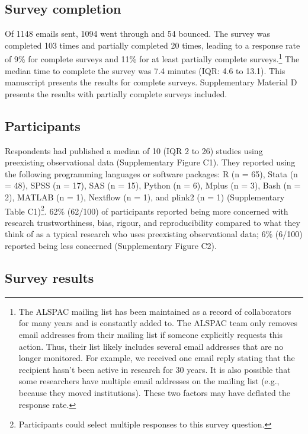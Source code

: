 \documentclass[
  man,floatsintext]{apa6}
\begin{document}
\hypertarget{survey-completion}{%
\subsection{Survey completion}\label{survey-completion}}

Of 1148 emails sent, 1094 went through and 54 bounced. The survey was completed 103 times and partially completed 20 times, leading to a response rate of 9\% for complete surveys and 11\% for at least partially complete surveys.\footnote[1]{The ALSPAC mailing list has been maintained as a record of collaborators for many years and is constantly added to. The ALSPAC team only removes email addresses from their mailing list if someone explicitly requests this action. Thus, their list likely includes several email addresses that are no longer monitored. For example, we received one email reply stating that the recipient hasn’t been active in research for 30 years. It is also possible that some researchers have multiple email addresses on the mailing list (e.g., because they moved institutions). These two factors may have deflated the response rate.} The median time to complete the survey was 7.4 minutes (IQR: 4.6 to 13.1). This manuscript presents the results for complete surveys. Supplementary Material D presents the results with partially complete surveys included.

\hypertarget{participants-1}{%
\subsection{Participants}\label{participants-1}}

Respondents had published a median of 10 (IQR 2 to 26) studies using preexisting observational data (Supplementary Figure C1). They reported using the following programming languages or software packages: R (n = 65), Stata (n = 48), SPSS (n = 17), SAS (n = 15), Python (n = 6), Mplus (n = 3), Bash (n = 2), MATLAB (n = 1), Nextflow (n = 1), and plink2 (n = 1) (Supplementary Table C1)\footnote[2]{Participants could select multiple responses to this survey question.}. 62\% (62/100) of participants reported being more concerned with research trustworthiness, bias, rigour, and reproducibility compared to what they think of as a typical research who uses preexisting observational data; 6\% (6/100) reported being less concerned (Supplementary Figure C2).

\hypertarget{survey-results}{%
\subsection{Survey results}\label{survey-results}}
\end{document}

